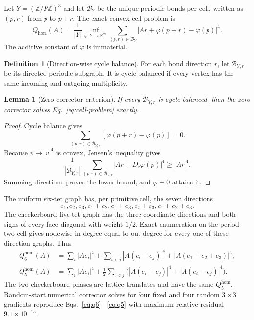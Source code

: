 \documentclass[11pt]{article}
\numberwithin{equation}{section}
\newtheorem{lemma}[theorem]{Lemma}
\theoremstyle{definition}
\newtheorem{definition}[theorem]{Definition}
\theoremstyle{remark}
\newcommand{\RR}{\mathbb R}
\begin{document}
Let $Y=(\mathbb Z/P\mathbb Z)^3$ and let $\mathcal B_Y$ be the unique periodic
bonds per cell, written as $(p,r)$ from $p$ to $p+r$.  The exact convex cell
problem is
\begin{equation}
 Q_{\mathrm{hom}}(A)=\frac1{|Y|}
 \inf_{\varphi:Y\to\RR^m}
 \sum_{(p,r)\in\mathcal B_Y}
 |Ar+\varphi(p+r)-\varphi(p)|^4.
 \label{eq:cell-problem}
\end{equation}
The additive constant of $\varphi$ is immaterial.

\begin{definition}[Direction-wise cycle balance]
For each bond direction $r$, let $\mathcal B_{Y,r}$ be its directed periodic
subgraph.  It is cycle-balanced if every vertex has the same incoming and
outgoing multiplicity.
\end{definition}

\begin{lemma}[Zero-corrector criterion]
If every $\mathcal B_{Y,r}$ is cycle-balanced, then the zero corrector solves
Eq.~\eqref{eq:cell-problem} exactly.
\end{lemma}

\begin{proof}
Cycle balance gives
\begin{equation}
 \sum_{(p,r)\in\mathcal B_{Y,r}}
 [\varphi(p+r)-\varphi(p)]=0.
\end{equation}
Because $v\mapsto|v|^4$ is convex, Jensen's inequality gives
\begin{equation}
 \frac1{|\mathcal B_{Y,r}|}\sum_{(p,r)\in\mathcal B_{Y,r}}
 |Ar+D_r\varphi(p)|^4\ge |Ar|^4.
\end{equation}
Summing directions proves the lower bound, and $\varphi=0$ attains it.
\end{proof}

The uniform six-tet graph has, per primitive cell, the seven directions
\begin{equation}
 e_1,e_2,e_3,e_1+e_2,e_1+e_3,e_2+e_3,e_1+e_2+e_3.
\end{equation}
The checkerboard five-tet graph has the three coordinate directions and both
signs of every face diagonal with weight $1/2$.  Exact enumeration on the
period-two cell gives nodewise in-degree equal to out-degree for every one of
these direction graphs.  Thus
\begin{align}
 Q_6^{\mathrm{hom}}(A)
 &=\sum_i|Ae_i|^4+\sum_{i<j}|A(e_i+e_j)|^4
   +|A(e_1+e_2+e_3)|^4,
 \label{eq:q6}\\
 Q_5^{\mathrm{hom}}(A)
 &=\sum_i|Ae_i|^4+\frac12\sum_{i<j}
 \bigl(|A(e_i+e_j)|^4+|A(e_i-e_j)|^4\bigr).
 \label{eq:q5}
\end{align}
The two checkerboard phases are lattice translates and have the same
$Q_5^{\mathrm{hom}}$.  Random-start numerical corrector solves for four fixed
and four random $3\times3$ gradients reproduce Eqs.~\eqref{eq:q6}--
\eqref{eq:q5} with maximum relative residual $9.1\times10^{-15}$.
\end{document}
